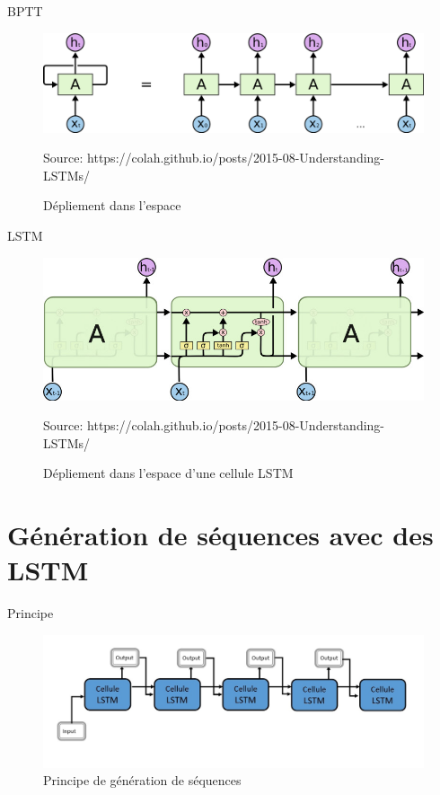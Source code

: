 \documentclass{beamer}
\begin{document}
\begin{frame}{BPTT}
  \begin{figure}
  \begin{center}
  \includegraphics[scale=0.15]{images/bptt.png}
  \caption{Dépliement dans l'espace}
  {\tiny Source: https://colah.github.io/posts/2015-08-Understanding-LSTMs/}
  \end{center}
  \end{figure}
\end{frame}

\begin{frame}{LSTM}
  \begin{figure}
  \begin{center}
  \includegraphics[scale=.37]{images/lstm_bptt.png}
  \caption{Dépliement dans l'espace d'une cellule LSTM}
  {\tiny Source: https://colah.github.io/posts/2015-08-Understanding-LSTMs/}
  \end{center}
  \end{figure}
\end{frame}

\section{Génération de séquences avec des LSTM}


\begin{frame}{Principe}
\begin{figure}
\begin{center}
\includegraphics[scale=0.5]{images/lstm_generation.png}
\caption{Principe de génération de séquences}
\end{center}
\end{figure}
\end{frame}
\end{document}
